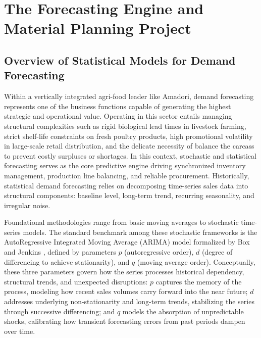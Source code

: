 
\chapter{The Forecasting Engine and Material Planning Project}
\label{chap:demandforecast}

\section{Overview of Statistical Models for Demand Forecasting}

Within a vertically integrated agri-food leader like Amadori, demand forecasting represents one of the business functions capable of generating the highest strategic 
and operational value. Operating in this sector entails managing structural complexities such as rigid biological lead times in livestock farming, strict shelf-life 
constraints on fresh poultry products, high promotional volatility in large-scale retail distribution, and the delicate necessity of balance the carcass to prevent 
costly surpluses or shortages. In this context, stochastic and statistical forecasting serves as the core predictive engine driving synchronized 
inventory management, production line balancing, and reliable procurement. Historically, statistical demand forecasting relies on decomposing time-series sales 
data into structural components: baseline level, long-term trend, recurring seasonality, and irregular noise.

Foundational methodologies range from basic moving averages to stochastic time-series models. The standard benchmark among these stochastic frameworks is the 
AutoRegressive Integrated Moving Average (ARIMA) model formalized by Box and Jenkins \cite{box1970time}, defined by parameters $p$ (autoregressive order), 
$d$ (degree of differencing to achieve stationarity), and $q$ (moving average order). Conceptually, these three parameters govern how the series processes 
historical dependency, structural trends, and unexpected disruptions: $p$ captures the memory of the process, modeling how recent sales volumes carry forward 
into the near future; $d$ addresses underlying non-stationarity and long-term trends, stabilizing the series through successive differencing; and $q$ models 
the absorption of unpredictable shocks, calibrating how transient forecasting errors from past periods dampen over time.

